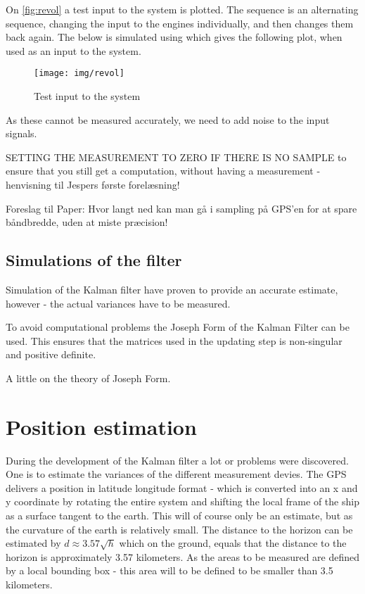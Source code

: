 On \vref{fig:revol} a test input to the system is plotted. The sequence is an alternating sequence, changing the input to the engines individually, and then changes them back again. The below is simulated using \Matlab which gives the following plot, when used as an input to the system.  
\begin{figure}[htbp]
	\centering
	\texttt{[image: img/revol]}
	\caption{Test input to the system}
	\label{fig:revol}
\end{figure}

As these cannot be measured accurately, we need to add noise to the input signals.

SETTING THE MEASUREMENT TO ZERO IF THERE IS NO SAMPLE to ensure that you still get a computation, without having a measurement - henvisning til Jespers første forelæsning!

Foreslag til Paper: Hvor langt ned kan man gå i sampling på GPS'en for at spare båndbredde, uden at miste præcision!

\subsection{Simulations of the filter}
Simulation of the Kalman filter have proven to provide an accurate estimate, however - the actual variances have to be measured. 

To avoid computational problems the Joseph Form of the Kalman Filter can be used. This ensures that the matrices used in the updating step is non-singular and positive definite. 

A little on the theory of Joseph Form.

\section{Position estimation}
During the development of the Kalman filter a lot or problems were discovered. One is to estimate the variances of the different measurement devies. The GPS delivers a position in latitude longitude format - which is converted into an x and y coordinate by rotating the entire system and shifting the local frame of the ship as a surface tangent to the earth. This will of course only be an estimate, but as the curvature of the earth is relatively small. The distance to the horizon can be estimated by $d \approx 3.57\sqrt{h}$ which on the ground, equals that the distance to the horizon is approximately 3.57 kilometers. As the areas to be measured are defined by a local bounding box - this area will to be defined to be smaller than 3.5 kilometers.

